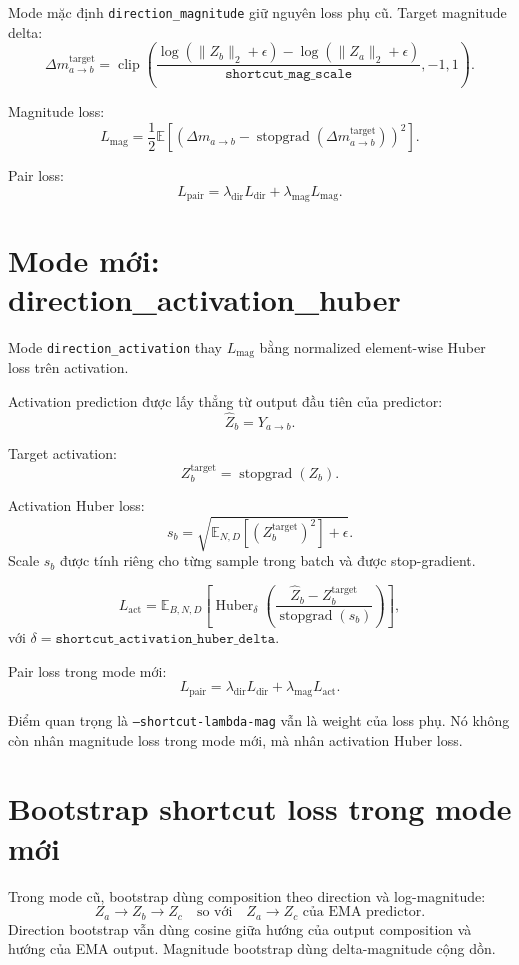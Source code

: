 \documentclass[11pt]{article}
\begin{document}
Mode mặc định \texttt{direction\_magnitude} giữ nguyên loss phụ cũ.
Target magnitude delta:
\[
\Delta m^{\text{target}}_{a \rightarrow b}
=
\operatorname{clip}
\left(
\frac{\log(\|Z_b\|_2 + \epsilon) - \log(\|Z_a\|_2 + \epsilon)}
{\texttt{shortcut\_mag\_scale}},
-1,
1
\right).
\]

Magnitude loss:
\[
L_{\text{mag}}
=
\frac{1}{2}
\mathbb{E}
\left[
\left(
\Delta m_{a \rightarrow b}
-
\operatorname{stopgrad}(\Delta m^{\text{target}}_{a \rightarrow b})
\right)^2
\right].
\]

Pair loss:
\[
L_{\text{pair}}
=
\lambda_{\text{dir}} L_{\text{dir}}
+
\lambda_{\text{mag}} L_{\text{mag}}.
\]

\section{Mode mới: direction\_activation\_huber}

Mode \texttt{direction\_activation} thay \(L_{\text{mag}}\) bằng normalized element-wise Huber loss trên activation.

Activation prediction được lấy thẳng từ output đầu tiên của predictor:
\[
\hat{Z}_b = Y_{a \rightarrow b}.
\]

Target activation:
\[
Z_b^{\text{target}} = \operatorname{stopgrad}(Z_b).
\]

Activation Huber loss:
\[
s_b
=
\sqrt{
\mathbb{E}_{N,D}
\left[
\left(Z_b^{\text{target}}\right)^2
\right]
+ \epsilon
}.
\]
Scale \(s_b\) được tính riêng cho từng sample trong batch và được stop-gradient.

\[
L_{\text{act}}
=
\mathbb{E}_{B,N,D}
\left[
\operatorname{Huber}_{\delta}
\left(
\frac{\hat{Z}_b - Z_b^{\text{target}}}{\operatorname{stopgrad}(s_b)}
\right)
\right],
\]
với \(\delta = \texttt{shortcut\_activation\_huber\_delta}\).

Pair loss trong mode mới:
\[
L_{\text{pair}}
=
\lambda_{\text{dir}} L_{\text{dir}}
+
\lambda_{\text{mag}} L_{\text{act}}.
\]

Điểm quan trọng là \texttt{--shortcut-lambda-mag} vẫn là weight của loss phụ.
Nó không còn nhân magnitude loss trong mode mới, mà nhân activation Huber loss.

\section{Bootstrap shortcut loss trong mode mới}

Trong mode cũ, bootstrap dùng composition theo direction và log-magnitude:
\[
Z_a \rightarrow Z_b \rightarrow Z_c
\quad \text{so với} \quad
Z_a \rightarrow Z_c \text{ của EMA predictor}.
\]
Direction bootstrap vẫn dùng cosine giữa hướng của output composition và hướng của EMA output.
Magnitude bootstrap dùng delta-magnitude cộng dồn.
\end{document}
